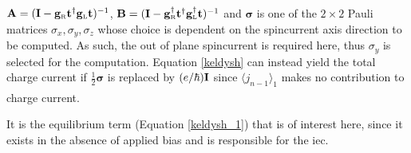 \documentclass[a4paper, 12pt]{article}
\begin{document}
$\bf A = (I - g_{\rm\scriptscriptstyle R}t^\dag g_{\rm\scriptscriptstyle L}t)^{\rm-1}$, $\bf B = (I -g_{\rm\scriptscriptstyle R}^\dag t^\dag g_{\rm\scriptscriptstyle L}^\dag t)^{\rm -1}$ and $\bm \sigma$ is one of the $2\times 2$ Pauli matrices $\sigma_x, \sigma_y, \sigma_z$ whose choice is dependent on the spincurrent axis direction to be computed. As such, the out of plane spincurrent is required here, thus $\sigma_y$ is selected for the computation. Equation \eqref{keldysh} can instead yield the total charge current if $\frac{1}{2}\bm\sigma$ is replaced by $(e/\hbar)\bf I $ since $\langle j_{n-1}\rangle_1$ makes no contribution to charge current\textcolor{blue}{\textsuperscript{\cite{keldysh_2}}}.
\\[2mm]\par It is the equilibrium term (Equation \eqref{keldysh_1}) that is of interest here, since it exists in the absence of applied bias and is responsible for the \gls{iec}.
	\tikzset{external/export next=false}
\end{document}
